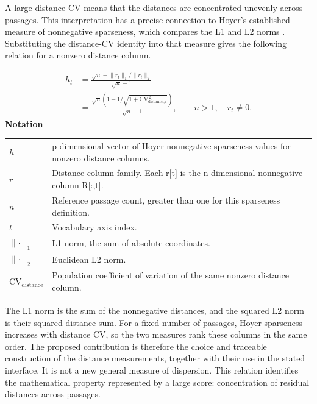 \documentclass[10pt,letterpaper]{article}
\newcommand{\notlabel}{\noindent\textbf{Notation}\par\nobreak\vspace{4pt}}
\begin{document}
A large distance CV means that the distances are concentrated unevenly across passages. This interpretation has a precise connection to Hoyer's established measure of nonnegative sparseness, which compares the L1 and L2 norms \cite{hoyer}. Substituting the distance-CV identity into that measure gives the following relation for a nonzero distance column.\par

\par\noindent\begin{minipage}{\linewidth}
\begin{equation}\label{eq:hoyerdistance}
\begin{aligned}h_t&=\frac{\sqrt n-\lVert r_t\rVert_1/\lVert r_t\rVert_2}{\sqrt n-1}\\&=\frac{\sqrt n\left(1-1/\sqrt{1+\mathrm{CV}_{\mathrm{distance},t}^{\,2}}\right)}{\sqrt n-1},\qquad n>1,\quad r_t\ne0.\end{aligned}
\end{equation}
\notlabel
{\fontsize{8.5}{10.5}\selectfont\setlength{\tabcolsep}{0pt}\renewcommand{\arraystretch}{1.12}
\begin{tabularx}{\linewidth}{@{}p{.14\linewidth}X@{}}
$h$ & p dimensional vector of Hoyer nonnegative sparseness values for nonzero distance columns.\\
$r$ & Distance column family. Each r[t] is the n dimensional nonnegative column R[:,t].\\
$n$ & Reference passage count, greater than one for this sparseness definition.\\
$t$ & Vocabulary axis index.\\
$\lVert\cdot\rVert_1$ & L1 norm, the sum of absolute coordinates.\\
$\lVert\cdot\rVert_2$ & Euclidean L2 norm.\\
$\mathrm{CV}_{\mathrm{distance}}$ & Population coefficient of variation of the same nonzero distance column.\\
\end{tabularx}}
\par\vspace{2pt}
\end{minipage}\par
The L1 norm is the sum of the nonnegative distances, and the squared L2 norm is their squared-distance sum. For a fixed number of passages, Hoyer sparseness increases with distance CV, so the two measures rank these columns in the same order. The proposed contribution is therefore the choice and traceable construction of the distance measurements, together with their use in the stated interface. It is not a new general measure of dispersion. This relation identifies the mathematical property represented by a large score: concentration of residual distances across passages.\par
\end{document}
